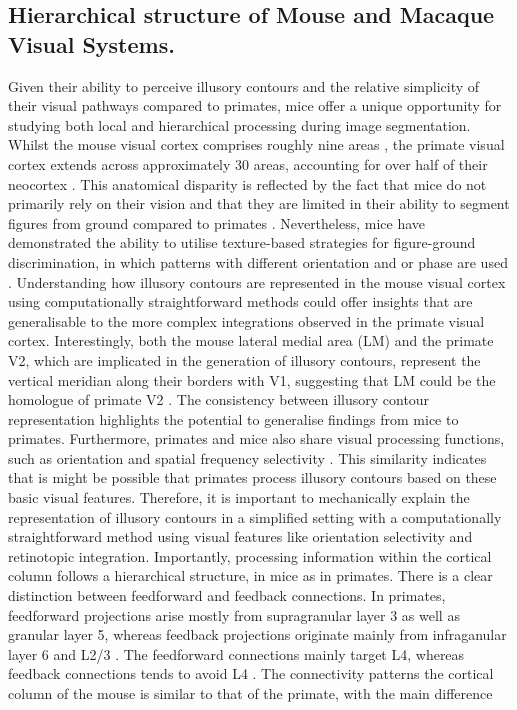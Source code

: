 \documentclass[12pt]{article}
\begin{document}

\subsection{Hierarchical structure of Mouse and Macaque Visual Systems.}
Given their ability to perceive illusory contours and the relative simplicity of their visual pathways compared to primates, mice offer a unique opportunity for studying both local and hierarchical processing during image segmentation. Whilst the mouse visual cortex comprises roughly nine areas \autocite{wangAreaMapMouse2007}, the primate visual cortex extends across approximately 30 areas, accounting for over half of their neocortex \autocite{fellemanDistributedHierarchicalProcessing1991}. This anatomical disparity is reflected by the fact that mice do not primarily rely on their vision and that they are limited in their ability to segment figures from ground compared to primates \autocite{luongoMicePrimatesUse2023}. Nevertheless, mice have demonstrated the ability to utilise texture-based strategies for figure-ground discrimination, in which patterns with different orientation and or phase are used \autocite{kirchbergerEssentialRoleFeedback2020}. Understanding how illusory contours are represented in the mouse visual cortex using computationally straightforward methods could offer insights that are generalisable to the more complex integrations observed in the primate visual cortex. Interestingly, both the mouse lateral medial area (LM) and the primate V2, which are implicated in the generation of illusory contours, represent the vertical meridian along their borders with V1, suggesting that LM could be the homologue of primate V2 \autocite{gamanutAnatomicalFunctionalConnectomes2022}. The consistency between illusory contour representation highlights the potential to generalise findings from mice to primates. Furthermore, primates and mice also share visual processing functions, such as orientation and spatial frequency selectivity \autocite{niellHighlySelectiveReceptive2008}. This similarity indicates that is might be possible that primates process illusory contours based on these basic visual features. Therefore, it is important to mechanically explain the representation of illusory contours in a simplified setting with a computationally straightforward method using visual features like orientation selectivity and retinotopic integration. Importantly, processing information within the cortical column follows a hierarchical structure, in mice as in primates. There is a clear distinction between feedforward and feedback connections. In primates, feedforward projections arise mostly from supragranular layer 3 as well as granular layer 5, whereas feedback projections originate mainly from infraganular layer 6 and L2/3 \autocite{markovAnatomyHierarchyFeedforward2014}. The feedforward connections mainly target L4, whereas feedback connections tends to avoid L4 \autocite{rocklandWhatWeKnow2019}. The connectivity patterns the cortical column of the mouse is similar to that of the primate, with the main difference 
\end{document}
